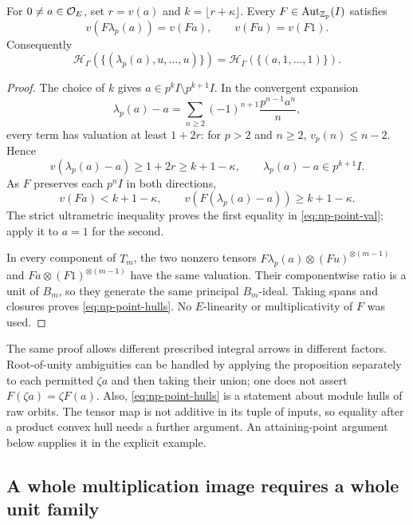 \begin{proposition}
\label{prop:np-point-bridge}
For $0\ne a\in\mathcal O_E$, set $r=v(a)$ and
$k=\lfloor r+\kappa\rfloor$. Every
$F\in\operatorname{Aut}_{\mathbb Z_p}(I)$ satisfies
\begin{equation}\label{eq:np-point-val}
             v(F\lambda_p(a))=v(Fa),\qquad v(Fu)=v(F1).
\end{equation}
Consequently
\begin{equation}\label{eq:np-point-hulls}
 \mathcal H_\Gamma(\{(\lambda_p(a),u,\ldots,u)\})
      =\mathcal H_\Gamma(\{(a,1,\ldots,1)\}).
\end{equation}
\end{proposition}
\begin{proof}
The choice of $k$ gives
$a\in p^kI\setminus p^{k+1}I$. In the convergent expansion
\[
 \lambda_p(a)-a
       =\sum_{n\ge2}(-1)^{n+1}\frac{p^{n-1}a^n}{n},
\]
every term has valuation at least $1+2r$: for $p>2$ and $n\ge2$,
$v_p(n)\le n-2$. Hence
\[
 v(\lambda_p(a)-a)\ge1+2r\ge k+1-\kappa,\qquad
              \lambda_p(a)-a\in p^{k+1}I.
\]
As $F$ preserves each $p^nI$ in both directions,
\[
 v(Fa)<k+1-\kappa,\qquad
 v(F(\lambda_p(a)-a))\ge k+1-\kappa.
\]
The strict ultrametric inequality proves the first equality in
\eqref{eq:np-point-val}; apply it to $a=1$ for the second.

In every component of $T_m$, the two nonzero tensors
$F\lambda_p(a)\otimes(Fu)^{\otimes(m-1)}$ and
$Fa\otimes(F1)^{\otimes(m-1)}$ have the same valuation.
Their componentwise ratio is a unit of $B_m$, so they generate
the same principal $B_m$-ideal. Taking spans and closures proves
\eqref{eq:np-point-hulls}. No $E$-linearity or multiplicativity
of $F$ was used.
\end{proof}

The same proof allows different prescribed integral arrows in
different factors. Root-of-unity ambiguities can be handled by
applying the proposition separately to each permitted $\zeta a$
and then taking their union; one does not assert
$F(\zeta a)=\zeta F(a)$. Also, \eqref{eq:np-point-hulls} is a
statement about module hulls of raw orbits. The tensor map is not
additive in its tuple of inputs, so equality after a product
convex hull needs a further argument. An attaining-point argument
below supplies it in the explicit example.

\subsection{A whole multiplication image requires a whole unit family}

